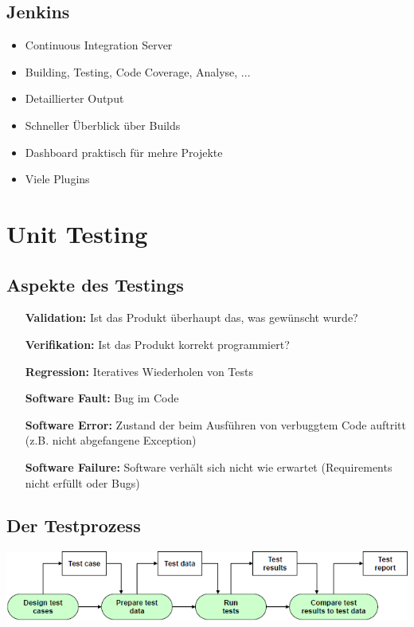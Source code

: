 \documentclass[a4paper,10pt]{article}
\newcommand{\Bold}[1]{\textbf{#1}} %
\begin{document}
\subsection{Jenkins}
\begin{itemize}
 \item Continuous Integration Server
 \item Building, Testing, Code Coverage, Analyse, ...
 \item Detaillierter Output
 \item Schneller Überblick über Builds
 \item Dashboard praktisch für mehre Projekte
 \item Viele Plugins
\end{itemize}

\pagebreak
\section{Unit Testing}

\subsection{Aspekte des Testings}
\begin{itemize}
 \item[\Bold {Validation:}] 			Ist das Produkt überhaupt das, was gewünscht wurde? 
 \item[\Bold {Verifikation:}]			Ist das Produkt korrekt programmiert?
 \item[\Bold {Regression:}]				Iteratives Wiederholen von Tests 
 \item[\Bold {Software Fault:}]		Bug im Code
 \item[\Bold {Software Error:}]		Zustand der beim Ausführen von verbuggtem Code auftritt (z.B. nicht abgefangene Exception)
 \item[\Bold {Software Failure:}] Software verhält sich nicht wie erwartet (Requirements nicht erfüllt oder Bugs)
\end{itemize}

\subsection{Der Testprozess}
\includegraphics[scale=0.75]{unit_test.png}
\end{document}
